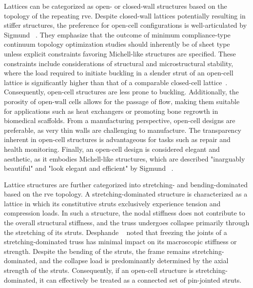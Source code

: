 Lattices can be categorized as open- or closed-wall structures based on the topology of the repeating \gls{rve}. Despite closed-wall lattices potentially resulting in stiffer structures, the preference for open-cell configurations is well-articulated by Sigmund \etal~. They emphasize that the outcome of minimum compliance-type continuum topology optimization studies should inherently be of sheet type unless explicit constraints favoring Michell-like structures are specified. These constraints include considerations of structural and microstructural stability, where the load required to initiate buckling in a slender strut of an open-cell lattice is significantly higher than that of a comparable closed-cell lattice~. Consequently, open-cell structures are less prone to buckling. Additionally, the porosity of open-wall cells allows for the passage of flow, making them suitable for applications such as heat exchangers or promoting bone regrowth in biomedical scaffolds. From a manufacturing perspective, open-cell designs are preferable, as very thin walls are challenging to manufacture. The transparency inherent in open-cell structures is advantageous for tasks such as repair and health monitoring. Finally, an open-cell design is considered elegant and aesthetic, as it embodies Michell-like structures, which are described "inarguably beautiful" and "look elegant and efficient" by Sigmund \etal~\cite{sigmund_non-optimality_2016}.

Lattice structures are further categorized into stretching- and bending-dominated based on the \gls{rve} topology. A stretching-dominated structure is characterized as a lattice in which its constitutive struts exclusively experience tension and compression loads. In such a structure, the nodal stiffness does not contribute to the overall structural stiffness, and the truss undergoes collapse primarily through the stretching of its struts. Desphande \etal~\cite{deshpande_foam_2001} noted that freezing the joints of a stretching-dominated truss has minimal impact on its macroscopic stiffness or strength. Despite the bending of the struts, the frame remains stretching-dominated, and the collapse load is predominantly determined by the axial strength of the struts. Consequently, if an open-cell structure is stretching-dominated, it can effectively be treated as a connected set of pin-jointed struts.

